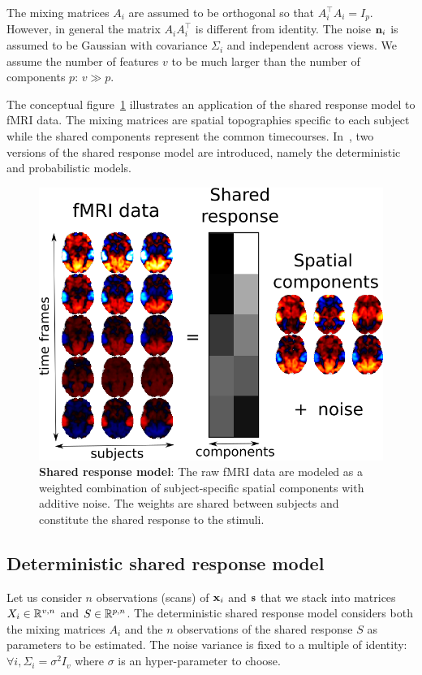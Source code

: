 \documentclass{article}
\begin{document}
The mixing matrices
$A_i$ are assumed to be orthogonal so that $A_i^{\top}A_i = I_p$.
%
However, in
general the matrix $A_i A_i^{\top}$ is different from identity.
%
The noise
$\mathbf{n}_i$ is assumed to be Gaussian with covariance $\Sigma_i$ and independent
across views.
%
We assume the number of features $v$ to be much larger than the
number of components $p$: $v \gg p$.
%


The conceptual figure~\ref{fig:srm:conceptual_figure} illustrates an 
application of the shared response model to fMRI data.
%
The mixing matrices are spatial topographies specific to each subject
while the shared components represent the common timecourses.
%
In~\cite{chen2015reduced, anderson2016enabling}, two versions of the
shared response model are introduced, namely the deterministic and
probabilistic models.

\begin{figure}
  \centering
  \includegraphics[scale=0.3]{figures/srm/conceptual_figure33.png}
  \caption{\textbf{Shared response model}: The raw fMRI data are modeled as a
    weighted combination of subject-specific spatial components with additive
    noise.
    The weights are shared between subjects and constitute the shared response
    to the stimuli.
  }
  \label{fig:srm:conceptual_figure}
\end{figure}


\subsection{Deterministic shared response model}
\label{sec:deterministicsrm}
Let us consider $n$ observations (scans) of $\mathbf{x}_i$ and $\mathbf{s}$ that we stack into
matrices $X_i \in \mathbb{R}^{v, n}$ and $S \in \mathbb{R}^{p, n}$.
%
The deterministic shared response model considers both the mixing matrices $A_i$ and
the $n$ observations of the shared response $S$ as parameters to be
estimated.
%
The noise variance is fixed to a multiple of identity: $\forall i,
\Sigma_i=\sigma^2 I_v$ where $\sigma$ is an hyper-parameter to choose.
\end{document}
